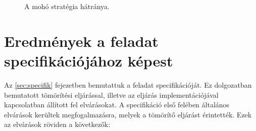 \documentclass[oneside,titlepage,12pt,a4paper]{report}
\begin{document}
\begin{figure}[htb!]
\caption{A mohó stratégia hátránya.}
\label{fig:counterexample}
\end{figure}	

\section{Eredmények a feladat specifikációjához képest}

Az \ref{sec:specifik} fejezetben bemutattuk a feladat specifikációját. Ez dolgozatban bemutatott tömörítési eljárással, illetve az eljárás implementációjával kapcsolatban állított fel elvárásokat. A specifikáció első felében általános elvárások kerültek megfogalmazásra, melyek a tömörítő eljárást érintették. Ezek az elvárások röviden a következők: 
\end{document}
